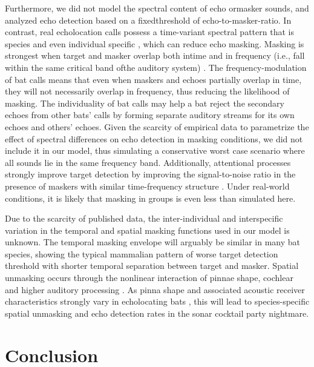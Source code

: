 \documentclass[
]{book}
\begin{document}
Furthermore, we did not model the spectral content of echo ormasker sounds, and analyzed echo detection based on a fixedthreshold of echo-to-masker-ratio. In contrast, real echolocation calls possess a time-variant spectral pattern that is species and even individual specific \citep{gillam2010a, yovel-a}, which can reduce echo masking. Masking is strongest when target and masker overlap both intime and in frequency (i.e., fall within the same critical band ofthe auditory system) \citep{ebata2003a, fletcher1940a}. The frequency-modulation of bat calls means that even when maskers and echoes partially overlap in time, they will not necessarily overlap in frequency, thus reducing the likelihood of masking. The individuality of bat calls may help a bat reject the secondary echoes from other bats' calls by forming separate auditory streams \citep{fay2008a} for its own echoes and others' echoes. Given the scarcity of empirical data to parametrize the effect of spectral differences on echo detection in masking conditions, we did not include it in our model, thus simulating a conservative worst case scenario where all sounds lie in the same frequency band. Additionally, attentional processes strongly improve target detection by improving the signal-to-noise ratio in the presence of maskers with similar time-frequency structure \citep{hafter2008a}. Under real-world conditions, it is likely that masking in groups is even less than simulated here.

Due to the scarcity of published data, the inter-individual and interspecific variation in the temporal and spatial masking functions used in our model is unknown. The temporal masking envelope will arguably be similar in many bat species, showing the typical mammalian pattern of worse target detection threshold with shorter temporal separation between target and masker. Spatial unmasking occurs through the nonlinear interaction of pinnae shape, cochlear and higher auditory processing \citep{ebata2003a, culling-a}. As pinna shape and associated acoustic receiver characteristics strongly vary in echolocating bats \citep{obrist1993a}, this will lead to species-specific spatial unmasking and echo detection rates in the sonar cocktail party nightmare.

\hypertarget{conclusion}{%
\section{Conclusion}\label{conclusion}}
\end{document}
